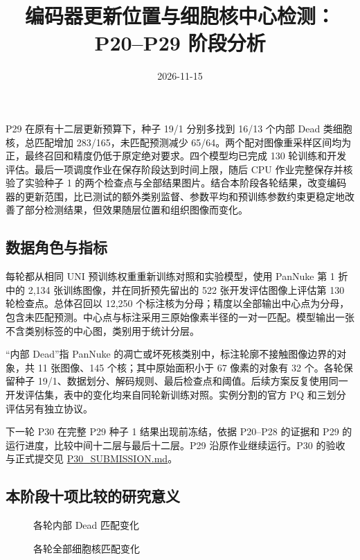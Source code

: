 \documentclass[
  11pt,
  fontset=fandol]{ctexart}
\title{编码器更新位置与细胞核中心检测：P20--P29 阶段分析}
\author{}
\date{2026-11-15}
\begin{document}
\maketitle

{
\setcounter{tocdepth}{2}
\tableofcontents
}
P29 在原有十二层更新预算下，种子 19/1 分别多找到 16/13 个内部 Dead
类细胞核，总匹配增加 283/165，未匹配预测减少
65/64。两个配对图像重采样区间均为正，最终召回和精度仍低于原定绝对要求。四个模型均已完成
130 轮训练和开发评估。最后一项调度作业在保存阶段达到时间上限，随后 CPU
作业完整保存并核验了实验种子 1
的两个检查点与全部结果图片。结合本阶段各轮结果，改变编码器的更新范围，比已测试的额外类别监督、参数平均和预训练参数约束更稳定地改善了部分检测结果，但效果随层位置和组织图像而变化。

\subsection{数据角色与指标}\label{ux6570ux636eux89d2ux8272ux4e0eux6307ux6807}

每轮都从相同 UNI 预训练权重重新训练对照和实验模型，使用 PanNuke 第 1
折中的 2,134 张训练图像，并在同折预先留出的 522 张开发评估图像上评估第
130 轮检查点。总体召回以 12,250
个标注核为分母；精度以全部输出中心点为分母，包含未匹配预测。中心点与标注采用三原始像素半径的一对一匹配。模型输出一张不含类别标签的中心图，类别用于统计分层。

``内部 Dead''指 PanNuke
的凋亡或坏死核类别中，标注轮廓不接触图像边界的对象，共 11 张图像、145
个核；其中原始面积小于 67 像素的对象有 32 个。各轮保留种子
19/1、数据划分、解码规则、最后检查点和阈值。后续方案反复使用同一开发评估集，表中的变化均来自同轮新训练对照。实例分割的官方
PQ 和三划分评估另有独立协议。

下一轮 P30 在完整 P29 种子 1 结果出现前冻结，依据 P20--P28 的证据和 P29
的运行进度，比较中间十二层与最后十二层。P29 沿原作业继续运行。P30
的验收与正式提交见 \href{../P30_SUBMISSION.md}{P30\_SUBMISSION.md}。

\subsection{本阶段十项比较的研究意义}\label{ux672cux9636ux6bb5ux5341ux9879ux6bd4ux8f83ux7684ux7814ux7a76ux610fux4e49}

\begin{figure}[H]\centering

\caption{各轮内部 Dead 匹配变化}
\end{figure}

\begin{figure}[H]\centering

\caption{各轮全部细胞核匹配变化}
\end{figure}
\end{document}
